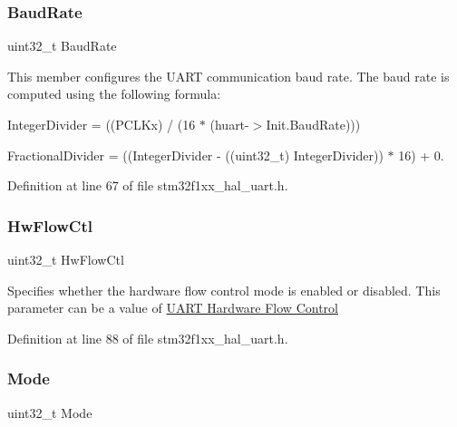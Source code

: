 \subsubsection{\texorpdfstring{Baud\+Rate}{BaudRate}}
{\footnotesize\ttfamily uint32\+\_\+t Baud\+Rate}

This member configures the U\+A\+RT communication baud rate. The baud rate is computed using the following formula\+:
\begin{DoxyItemize}
\item Integer\+Divider = ((P\+C\+L\+Kx) / (16 $\ast$ (huart-\/$>$Init.\+Baud\+Rate)))
\item Fractional\+Divider = ((Integer\+Divider -\/ ((uint32\+\_\+t) Integer\+Divider)) $\ast$ 16) + 0. 
\end{DoxyItemize}

Definition at line 67 of file stm32f1xx\+\_\+hal\+\_\+uart.\+h.

\mbox{\label{struct_u_a_r_t___init_type_def_a0a933d213b17470c582c8fec23a24d09}} 
\subsubsection{\texorpdfstring{Hw\+Flow\+Ctl}{HwFlowCtl}}
{\footnotesize\ttfamily uint32\+\_\+t Hw\+Flow\+Ctl}

Specifies whether the hardware flow control mode is enabled or disabled. This parameter can be a value of \hyperlink{group___u_a_r_t___hardware___flow___control}{U\+A\+RT Hardware Flow Control} 

Definition at line 88 of file stm32f1xx\+\_\+hal\+\_\+uart.\+h.

\mbox{\label{struct_u_a_r_t___init_type_def_a0ffc93ec511ed9cf1663f6939bd3e839}} 
\subsubsection{\texorpdfstring{Mode}{Mode}}
{\footnotesize\ttfamily uint32\+\_\+t Mode}


